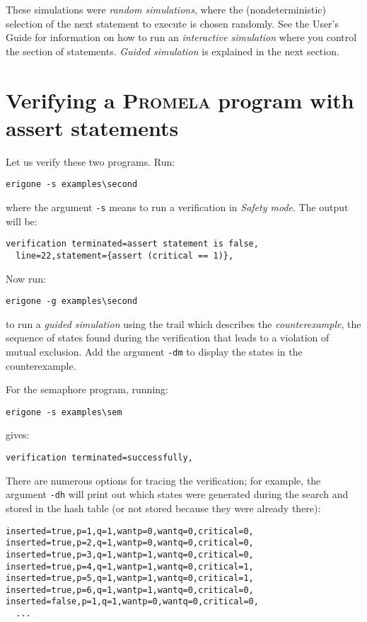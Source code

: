 \documentclass[11pt]{article}
\newcommand*{\prm}{\textsc{Promela}}
\newcommand*{\p}[1]{\texttt{#1}}
\begin{document}
These simulations were \emph{random simulations}, where the
(nondeterministic) selection of the next statement to execute is chosen
randomly. See the User's Guide for information on how to run an
\emph{interactive simulation} where you control the section of
statements. \emph{Guided simulation} is explained in the next section.

\section{Verifying a \prm{} program with assert statements}

Let us verify these two programs. Run:
\begin{verbatim}
erigone -s examples\second
\end{verbatim}
where the argument \p{-s} means to run a verification in \emph{Safety mode}.
The output will be:
\begin{verbatim}
verification terminated=assert statement is false,
  line=22,statement={assert (critical == 1)},
\end{verbatim}
Now run:
\begin{verbatim}
erigone -g examples\second
\end{verbatim}
to run a \emph{guided simulation} using the trail which describes the
\emph{counterexample}, the sequence of states found during the
verification that leads to a violation of mutual exclusion. Add the
argument \p{-dm} to display the states in the counterexample.

For the semaphore program, running:
\begin{verbatim}
erigone -s examples\sem
\end{verbatim}
gives:
\begin{verbatim}
verification terminated=successfully,
\end{verbatim}

There are numerous options for tracing the verification; for example,
the argument \p{-dh} will print out which states were generated during
the search and stored in the hash table (or not stored because they were
already there):

\begin{verbatim}
inserted=true,p=1,q=1,wantp=0,wantq=0,critical=0,
inserted=true,p=2,q=1,wantp=0,wantq=0,critical=0,
inserted=true,p=3,q=1,wantp=1,wantq=0,critical=0,
inserted=true,p=4,q=1,wantp=1,wantq=0,critical=1,
inserted=true,p=5,q=1,wantp=1,wantq=0,critical=1,
inserted=true,p=6,q=1,wantp=1,wantq=0,critical=0,
inserted=false,p=1,q=1,wantp=0,wantq=0,critical=0,
  ...
\end{verbatim}
\end{document}

